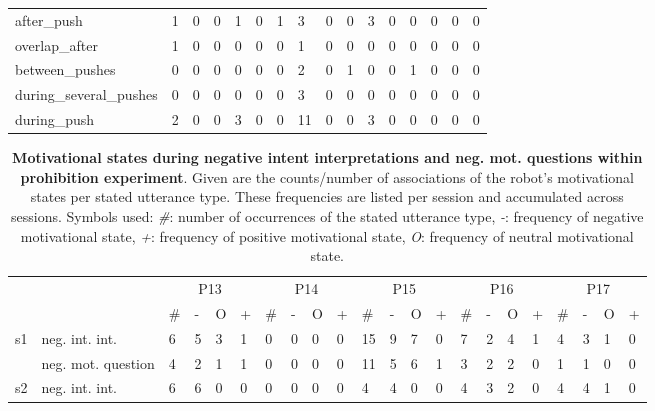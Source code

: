 \begin{screenonly}
\begin{table*}[h]
\begin{tabular*}{\hsize}{@{\extracolsep{\fill}}llllllllllllllll}
    after\_push & 1 & 0 & 0 & 1 & 0 & 1 & 3 & 0 & 0 & 3 & 0 & 0 & 0 & 0 & 0\\
    overlap\_after & 1 & 0 & 0 & 0 & 0 & 0 & 1 & 0 & 0 & 0 & 0 & 0 & 0 & 0 & 0\\
    between\_pushes & 0 & 0 & 0 & 0 & 0 & 0 & 2 & 0 & 1 & 0 & 0 & 1 & 0 & 0 & 0\\
    during\_several\_pushes & 0 & 0 & 0 & 0 & 0 & 0 & 3 & 0 & 0 & 0 & 0 & 0 & 0 & 0 & 0\\
    during\_push & 2 & 0 & 0 & 3 & 0 & 0 & 11 & 0 & 0 & 3 & 0 & 0 & 0 & 0 & 0\\
    \bottomrule
  \end{tabular*}
\end{table*}
\begin{table*}[h]
  \setlength{\tabcolsep}{0.95ex}
  \caption{\textbf{Motivational states during negative intent interpretations and neg. mot. questions within prohibition experiment}. 
    Given are the counts/number of associations of the robot's motivational states per stated utterance type. These frequencies are
    listed per session and accumulated across sessions. Symbols used: \emph{\#}: number of occurrences of the stated utterance type,
    \emph{-}: frequency of negative motivational state, \emph{+}: frequency of positive motivational state, \emph{O}: frequency of
    neutral motivational state.}
  \label{tbl:neg_int_int_mot2}
  \begin{small}
    \begin{tabular*}{\hsize}{@{\extracolsep{\fill}}llllllllllllllllllllll}
      \toprule
      &  & \multicolumn{4}{c}{P13} & \multicolumn{4}{c}{P14} & \multicolumn{4}{c}{P15} & \multicolumn{4}{c}{P16} & \multicolumn{4}{c}{P17}\\
      \cmidrule(lr){3-6}\cmidrule(lr){7-10}\cmidrule(lr){11-14}\cmidrule(lr){15-18}\cmidrule(lr){19-22}
      &  & \# & - & O & + & \# & - & O & + & \# & - & O & + & \# & - & O & + & \# & - & O & +\\
      \cmidrule(lr){3-6}\cmidrule(lr){7-10}\cmidrule(lr){11-14}\cmidrule(lr){15-18}\cmidrule(lr){19-22}
      \multirow{2}{*}{s1} & neg. int. int. & 6 & 5 & 3 & 1 & 0 & 0 & 0 & 0 & 15 & 9 & 7 & 0 & 7 & 2 & 4 & 1 & 4 & 3 & 1 & 0\\
      & neg. mot. question & 4 & 2 & 1 & 1 & 0 & 0 & 0 & 0 & 11 & 5 & 6 & 1 & 3 & 2 & 2 & 0 & 1 & 1 & 0 & 0\\
      \multirow{2}{*}{s2} & neg. int. int. & 6 & 6 & 0 & 0 & 0 & 0 & 0 & 0 & 4 & 4 & 0 & 0 & 4 & 3 & 2 & 0 & 4 & 4 & 1 & 0\\

\end{tabular*}
\end{small}
\end{table*}
\end{screenonly}
